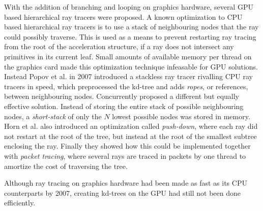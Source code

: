 With the addition of branching and looping on graphics hardware, several GPU
based hierarchical ray tracers were proposed. A known optimization to CPU based
hierarchical ray tracers is to use a stack of neighbouring nodes that the ray
could possibly traverse. This is used as a means to prevent restarting ray
tracing from the root of the acceleration structure, if a ray does not intersect
any primitives in its current leaf. Small amounts of available memory per thread
on the graphics card made this optimization technique infeasable for GPU
solutions. Instead Popov et al. in 2007 introduced a
stackless ray tracer rivalling CPU ray tracers in speed, which preprocessed the
kd-tree and adds \textit{ropes}, or references, between neighbouring
nodes. Concurrently \horn{} proposed a different but equally effective
solution. Instead of storing the entire stack of possible neighbouring nodes, a
\textit{short-stack} of only the $N$ lowest possible nodes was stored in
memory. Horn et al. also introduced an optimization called \textit{push-down},
where each ray did not restart at the root of the tree, but instead at the root
of the smallest subtree enclosing the ray. Finally they showed how this could be
implemented together with \textit{packet tracing}, where several rays are traced
in packets by one thread to amortize the cost of traversing the tree.




Although ray tracing on graphics hardware had been made as fast as its CPU
counterparts by 2007, creating kd-trees on the GPU had still not been done
efficiently.

